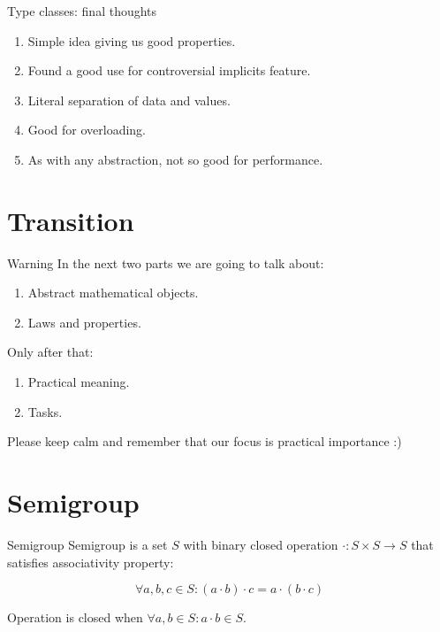 \documentclass[presentation,aspectratio=169,smaller]{beamer}
\begin{document}
\begin{frame}[label={sec:org00b8717}]{Type classes: final thoughts}
\begin{enumerate}
\item Simple idea giving us good properties.
\item Found a good use for controversial implicits feature.
\item Literal separation of data and values.
\item Good for overloading.
\item As with any abstraction, not so good for performance.
\end{enumerate}
\end{frame}

\section*{Transition}
\label{sec:org6e38641}

\begin{frame}[label={sec:orgabaf555}]{Warning}
In the next two parts we are going to talk about:

\begin{enumerate}
\item Abstract mathematical objects.
\item Laws and properties.
\end{enumerate}

\pause

Only after that:

\begin{enumerate}
\item Practical meaning.
\item Tasks.
\end{enumerate}

\pause

Please keep calm and remember that our focus is practical importance :)
\end{frame}

\section*{Semigroup}
\label{sec:org5b4c88b}

\begin{frame}[label={sec:org04bf507}]{Semigroup}
Semigroup is a set \(S\) with binary closed operation \(\cdot : S \times S
\rightarrow S\) that satisfies associativity property:

$$\forall a, b, c \in S : (a \cdot b) \cdot c = a \cdot (b \cdot c)$$

Operation is closed when \(\forall a, b \in S : a \cdot b \in S\).
\end{frame}
\end{document}
